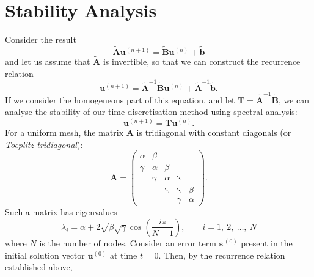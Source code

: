 \documentclass{article}
\begin{document}
\section{Stability Analysis}
Consider the result
\begin{equation*}
    \tilde{\symbf{A}} \symbf{u}^{\left( n+1 \right)} = \tilde{\symbf{B}} \symbf{u}^{\left( n \right)} + \tilde{\symbf{b}}
\end{equation*}
and let us assume that \(\tilde{\symbf{A}}\) is invertible, so that we
can construct the recurrence relation
\begin{equation*}
    \symbf{u}^{\left( n+1 \right)} = \tilde{\symbf{A}}^{-1} \tilde{\symbf{B}} \symbf{u}^{\left( n \right)} + \tilde{\symbf{A}}^{-1} \tilde{\symbf{b}}.
\end{equation*}
If we consider the homogeneous part of this equation, and let
\(\symbf{T} = \tilde{\symbf{A}}^{-1} \tilde{\symbf{B}}\), we can
analyse the stability of our time discretisation method using
spectral analysis:
\begin{equation*}
    \symbf{u}^{\left( n+1 \right)} = \symbf{T} \symbf{u}^{\left( n \right)}.
\end{equation*}
For a uniform mesh, the matrix \(\symbf{A}\) is tridiagonal with constant
diagonals (or \textit{Toeplitz tridiagonal}):
\begin{equation*}
    \symbf{A} =
    \begin{pmatrix}
        \alpha & \beta  &        &        &        \\
        \gamma & \alpha & \beta  &        &        \\
               & \gamma & \alpha & \ddots &        \\
               &        & \ddots & \ddots & \beta  \\
               &        &        & \gamma & \alpha
    \end{pmatrix}
    .
\end{equation*}
Such a matrix has eigenvalues
\begin{equation*}
    \lambda_i = \alpha + 2 \sqrt{\beta} \sqrt{\gamma} \cos\left( \frac{i \pi}{N+1} \right), \qquad i = 1,\: 2,\: \ldots,\: N
\end{equation*}
where \(N\) is the number of nodes. Consider an error term
\(\symbf{\varepsilon}^{\left( 0 \right)}\) present in the
initial solution vector \(\symbf{u}^{\left( 0 \right)}\) at time \(t = 0\).
Then, by the recurrence relation established above,
\end{document}
